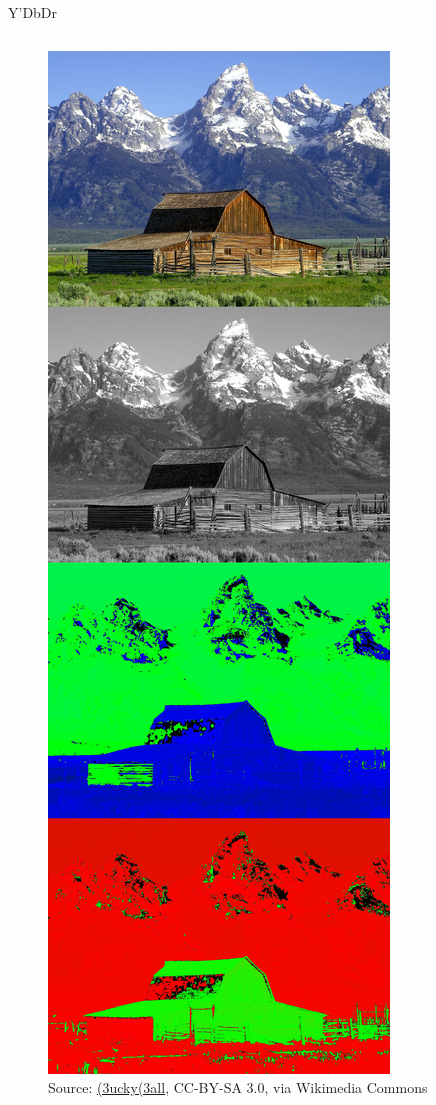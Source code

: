 \documentclass[aspectratio=169,usepdftitle=false]{fireshonks}
\begin{document}
\begin{frame}{Y'DbDr}
\begin{columns}
\begin{column}
\begin{figure}
                \includegraphics[height=10\baselineskip,keepaspectratio]{figures/YDbDr_components.jpg}
                \caption*{Source: \href{https://commons.wikimedia.org/wiki/File:YDbDr_components.jpg}{(3ucky(3all}, CC-BY-SA 3.0, via Wikimedia Commons}
            \end{figure}
        \end{column}
    \end{columns}
\end{frame}
\end{document}

